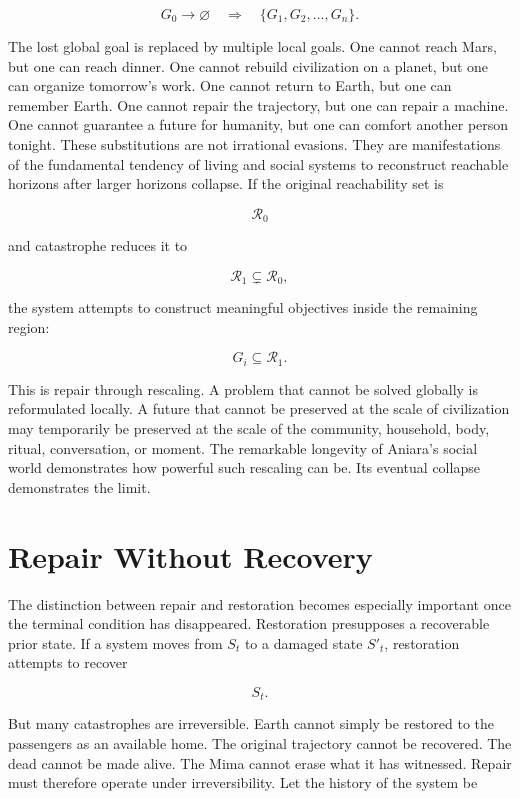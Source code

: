 \documentclass[11pt,oneside]{book}
\theoremstyle{definition}
\theoremstyle{remark}
\begin{document}
\[
G_0\rightarrow\varnothing \quad\Longrightarrow\quad \{G_1,G_2,\ldots,G_n\}.
\]

The lost global goal is replaced by multiple local goals. One cannot reach Mars, but one can reach
dinner. One cannot rebuild civilization on a planet, but one can organize tomorrow's work. One
cannot return to Earth, but one can remember Earth. One cannot repair the trajectory, but one can
repair a machine. One cannot guarantee a future for humanity, but one can comfort another person
tonight. These substitutions are not irrational evasions. They are manifestations of the fundamental
tendency of living and social systems to reconstruct reachable horizons after larger horizons
collapse. If the original reachability set is

\[
\mathcal{R}_0
\]

and catastrophe reduces it to

\[
\mathcal{R}_1\subsetneq\mathcal{R}_0,
\]

the system attempts to construct meaningful objectives inside the remaining region:

\[
G_i\subseteq\mathcal{R}_1.
\]

This is repair through rescaling. A problem that cannot be solved globally is reformulated locally.
A future that cannot be preserved at the scale of civilization may temporarily be preserved at the
scale of the community, household, body, ritual, conversation, or moment. The remarkable longevity
of Aniara's social world demonstrates how powerful such rescaling can be. Its eventual collapse
demonstrates the limit.

\section{Repair Without Recovery}

The distinction between repair and restoration becomes especially important once the terminal
condition has disappeared. Restoration presupposes a recoverable prior state. If a system moves from
\(S_t\) to a damaged state \(S'_t\), restoration attempts to recover

\[
S_t.
\]

But many catastrophes are irreversible. Earth cannot simply be restored to the passengers as an
available home. The original trajectory cannot be recovered. The dead cannot be made alive. The Mima
cannot erase what it has witnessed. Repair must therefore operate under irreversibility. Let the
history of the system be
\end{document}
